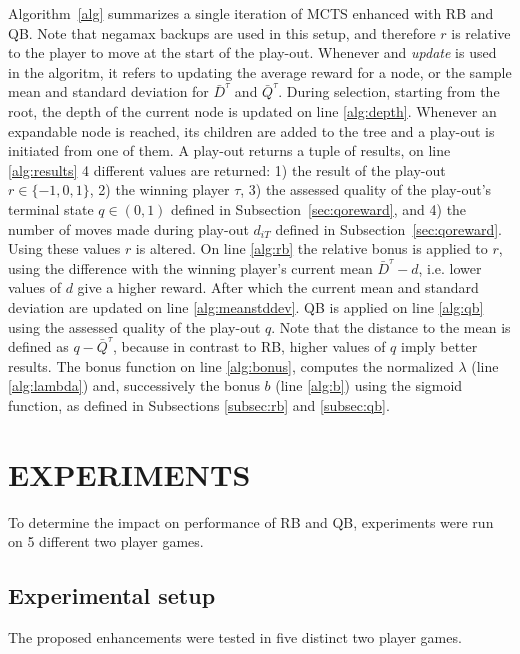 \documentclass{ecai2014}
\begin{document}
Algorithm~\ref{alg} summarizes a single iteration of MCTS enhanced with RB and QB. Note that negamax backups are used in this setup, and therefore $r$ is relative to the player to move at the start of the play-out. Whenever and \emph{update} is used in the algoritm, it refers to updating the average reward for a node, or the sample mean and standard deviation for $\bar{D}^\tau$ and $\bar{Q}^\tau$. During selection, starting from the root, the depth of the current node is updated on line \ref{alg:depth}. Whenever an expandable node is reached, its children are added to the tree and a play-out is initiated from one of them. A play-out returns a tuple of results, on line \ref{alg:results} 4 different values are returned: 1) the result of the play-out $r \in \{-1, 0, 1\}$, 2) the winning player $\tau$, 3) the assessed quality of the play-out's terminal state $q \in (0,1)$ defined in Subsection~\ref{sec:qoreward}, and 4) the number of moves made during play-out $d_{iT}$ defined in Subsection~\ref{sec:qoreward}. Using these values $r$ is altered. On line \ref{alg:rb} the relative bonus is applied to $r$, using the difference with the winning player's current mean $\bar{D}^\tau - d$, i.e. lower values of $d$ give a higher reward. After which the current mean and standard deviation are updated on line \ref{alg:meanstddev}. QB is applied on line \ref{alg:qb} using the assessed quality of the play-out $q$. Note that the distance to the mean is defined as $q - \bar{Q}^\tau$, because in contrast to RB, higher values of $q$ imply better results. The {\sc bonus} function on line \ref{alg:bonus}, computes the normalized $\lambda$ (line \ref{alg:lambda}) and, successively the bonus $b$ (line \ref{alg:b}) using the sigmoid function, as defined in Subsections \ref{subsec:rb} and \ref{subsec:qb}.

\section{EXPERIMENTS}
\label{sec:experiments}
To determine the impact on performance of RB and QB, experiments were run on 5 different two player games.

\subsection{Experimental setup}
\label{subsec:expsetup}
The proposed enhancements were tested in five distinct two player games.
\end{document}
